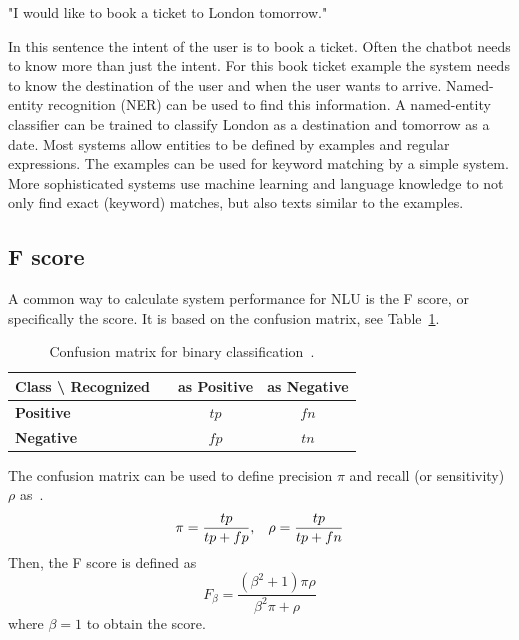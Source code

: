 \begin{center}
"I would like to book a ticket to London tomorrow."
\end{center}

In this sentence the intent of the user is to book a ticket.
Often the chatbot needs to know more than just the intent.
For this book ticket example the system needs to know the destination of the user and when the user wants to arrive.
Named-entity recognition (NER) can be used to find this information.
A named-entity classifier can be trained to classify London as a destination and tomorrow as a date.
Most systems allow entities to be defined by examples and regular expressions.
The examples can be used for keyword matching by a simple system.
More sophisticated systems use machine learning and language knowledge to not only find exact (keyword) matches, but also texts similar to the examples.

\subsection{F score}
\label{subsec:f1_score}
A common way to calculate system performance for NLU is the F score, or specifically the \fone score.
It is based on the confusion matrix, see Table~\ref{tab:confusion}.

\begin{table}[htbp]
    \centering
    \begin{tabular}{l l c c}
        \textbf{Class \textbackslash \: Recognized} & \vline & \textbf{as Positive} & \textbf{as Negative}\\
        \hline
        \textbf{Positive} & \vline & $tp$ & $fn$\\
        \textbf{Negative} & \vline & $fp$ & $tn$\\
    \end{tabular}
    \caption{Confusion matrix for binary classification~\cite[Table 1]{sokolova2006beyond}.}
    \label{tab:confusion}
\end{table}

\noindent The confusion matrix can be used to define precision $\pi$ and recall (or sensitivity) $\rho$ as~\citep{sokolova2006beyond}.
\[
    \pi = \frac{tp}{tp + fp}, \hspace*{3mm} \rho = \frac{tp}{tp + fn}
\]
Then, the F score is defined as~\citep{debole2004supervised}
\[
    F_\beta = \frac{(\beta^2 + 1) \pi \rho}{\beta^2 \pi + \rho}
\]
where $\beta = 1$ to obtain the \fone score.

